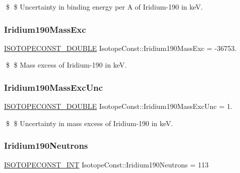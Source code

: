\$ \$ Uncertainty in binding energy per A of Iridium-\/190 in keV. \mbox{\label{group___isotope_const-_iridium-_ir190_ga50d78172ccb75ced824e0dab6edf12ee}} 
\subsubsection{\texorpdfstring{Iridium190\+Mass\+Exc}{Iridium190MassExc}}
{\footnotesize\ttfamily \mbox{\hyperlink{group___isotope_const-_macros_ga8f45a7272ce02c0b4c65c44636ed719a}{I\+S\+O\+T\+O\+P\+E\+C\+O\+N\+S\+T\+\_\+\+D\+O\+U\+B\+LE}} Isotope\+Const\+::\+Iridium190\+Mass\+Exc = -\/36753.}

\$ \$ Mass excess of Iridium-\/190 in keV. \mbox{\label{group___isotope_const-_iridium-_ir190_ga3efd9098912e576ef555ab839d493978}} 
\subsubsection{\texorpdfstring{Iridium190\+Mass\+Exc\+Unc}{Iridium190MassExcUnc}}
{\footnotesize\ttfamily \mbox{\hyperlink{group___isotope_const-_macros_ga8f45a7272ce02c0b4c65c44636ed719a}{I\+S\+O\+T\+O\+P\+E\+C\+O\+N\+S\+T\+\_\+\+D\+O\+U\+B\+LE}} Isotope\+Const\+::\+Iridium190\+Mass\+Exc\+Unc = 1.}

\$ \$ Uncertainty in mass excess of Iridium-\/190 in keV. \mbox{\label{group___isotope_const-_iridium-_ir190_ga5446fe2ec1a30acf0f1667cdf40d2761}} 
\subsubsection{\texorpdfstring{Iridium190\+Neutrons}{Iridium190Neutrons}}
{\footnotesize\ttfamily \mbox{\hyperlink{group___isotope_const-_macros_ga5f18360b3e99483a35c32d789e62621c}{I\+S\+O\+T\+O\+P\+E\+C\+O\+N\+S\+T\+\_\+\+I\+NT}} Isotope\+Const\+::\+Iridium190\+Neutrons = 113}

